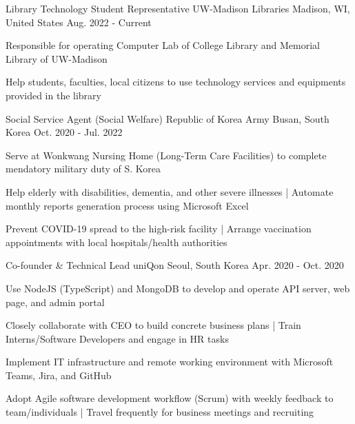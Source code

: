 

\begin{cventries}

  \cventry
  {Library Technology Student Representative} %
  {UW-Madison Libraries} %
  {Madison, WI, United States} %
  {Aug. 2022 - Current} %
  {
    \begin{cvitems} %
      \item {Responsible for operating Computer Lab of College Library and Memorial Library of UW-Madison}
      \item {Help students, faculties, local citizens to use technology services and equipments provided in the library}
    \end{cvitems}
  }

  \cventry
  {Social Service Agent (Social Welfare)} %
  {Republic of Korea Army} %
  {Busan, South Korea} %
  {Oct. 2020 - Jul. 2022} %
  {
    \begin{cvitems} %
      \item {Serve at Wonkwang Nursing Home (Long-Term Care Facilities) to complete mendatory military duty of S. Korea}
      \item {Help elderly with disabilities, dementia, and other severe illnesses | Automate monthly reports generation process using Microsoft Excel}
      \item {Prevent COVID-19 spread to the high-risk facility | Arrange vaccination appointments with local hospitals/health authorities}
    \end{cvitems}
  }

  \cventry
  {Co-founder \& Technical Lead} %
  {uniQon} %
  {Seoul, South Korea} %
  {Apr. 2020 - Oct. 2020} %
  {
    \begin{cvitems} %
      \item {Use NodeJS (TypeScript) and MongoDB to develop and operate API server, web page, and admin portal}
      \item {Closely collaborate with CEO to build concrete business plans | Train Interns/Software Developers and engage in HR tasks}
      \item {Implement IT infrastructure and remote working environment with Microsoft Teams, Jira, and GitHub}
      \item {Adopt Agile software development workflow (Scrum) with weekly feedback to team/individuals | Travel frequently for business meetings and recruiting}
    \end{cvitems}
  }


\end{cventries}

